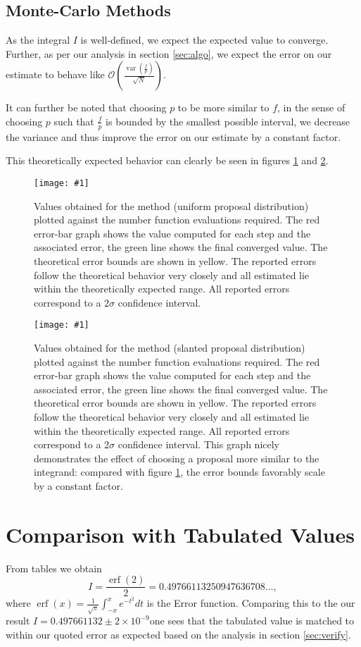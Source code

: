 \documentclass[10pt, a4paper]{article}
\newcommand{\plot}[3]{\begin{figure}[ht]\centering\texttt{[image: \#1]}\caption{#2}\label{#3}\end{figure}}
\newcommand{\final}{$I = 0.497661132 \pm 2\times10^{-9}$}
\begin{document}
  \subsection{Monte-Carlo Methods}
  As the integral $I$ is well-defined, we expect the expected value to converge. Further, as per our
  analysis in section \ref{sec:algo}, we expect the error on our estimate to behave like
  $\mathcal{O}\left( \frac{\operatorname{var}(\frac fp)}{\sqrt N} \right)$.

  It can further be noted that choosing $p$ to be more similar to $f$, in the sense of choosing $p$
  such that $\frac fp$ is bounded by the smallest possible interval, we decrease the variance and thus
  improve the error on our estimate by a constant factor.

  This theoretically expected behavior can clearly be seen in figures \ref{fig:mont-flat} and
  \ref{fig:mont-slant}.

  \plot{proj-mont-flat-accuracy}{
    Values obtained for the \is{} method (uniform proposal distribution) plotted against the number
    function evaluations required. The red
    error-bar graph shows the value computed for each step and the associated error, the green line
    shows the final converged value. The theoretical error bounds are shown in yellow. The reported errors
    follow the theoretical behavior very closely and all estimated lie within the theoretically expected range.
    All reported errors correspond to a $2\sigma$ confidence interval.
  }{fig:mont-flat}

  \plot{proj-mont-slanted-accuracy}{
    Values obtained for the \is{} method (slanted proposal distribution) plotted against the number
    function evaluations required. The red
    error-bar graph shows the value computed for each step and the associated error, the green line
    shows the final converged value. The theoretical error bounds are shown in yellow. The reported errors
    follow the theoretical behavior very closely and all estimated lie within the theoretically expected range.
    All reported errors correspond to a $2\sigma$ confidence interval. This graph nicely demonstrates the
    effect of choosing a proposal more similar to the integrand: compared with figure \ref{fig:mont-flat},
    the error bounds favorably scale by a constant factor.
  }{fig:mont-slant}

{}


\appendix{}

\section{Comparison with Tabulated Values}
\label{app:cheat}
From tables we obtain
\begin{equation}
I = \frac{\operatorname{erf}(2)}{2} = 0.49766113250947636708 \dots,
\end{equation}
where $\operatorname{erf}(x) = \frac{1}{\sqrt\pi}\int_{-x}^x e^{-t^2} dt$ is the Error function. Comparing
this to the our result \final one sees that the tabulated value is matched to within our
quoted error as expected based on the analysis in section \ref{sec:verify}.
\end{document}
